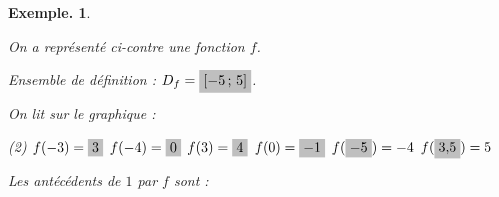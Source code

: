 \documentclass[12pt]{article}
\theoremstyle{break}
\newtheorem*{example}{Exemple.}
\begin{document}
\begin{example}
    \begin{minipage}{0.5\linewidth}
    \begin{center}
      \grapheF
    \end{center}
    \end{minipage}
    \hfill
    \begin{minipage}{0.46\linewidth}\raggedright
    On a représenté ci-contre une fonction $f$.

    \medskip
    Ensemble de définition : $D_f = \hide{$\intff{-5}{5}$}$.

    \medskip
    On lit sur le graphique :
    \begin{tasks}[label=\textbullet](2)
      \task $f(-3)=\hideM{3}$
      \task $f(-4)=\hideM{0}$
      \task $f(3)=\hideM{4}$
      \task $f(0)=\hideM{-1}$
      \task $f(\hideM{-5})=-4$
      \task $f(\hideM{3{,}5})=5$
    \end{tasks}

    \medskip
    Les antécédents de $1$ par $f$ sont :

    \end{minipage}
\end{example}
\end{document}
